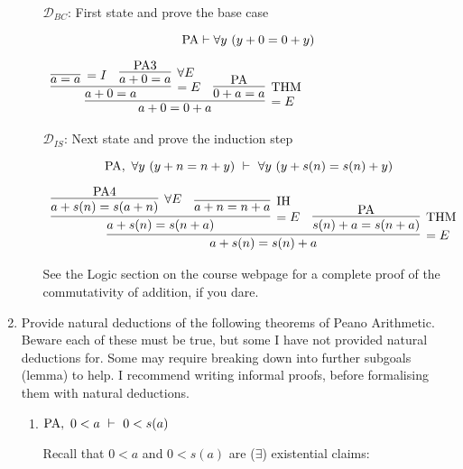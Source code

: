 \documentclass[11pt]{report}
\begin{document}
\begin{enumerate}
\begin{enumerate}
		$\mathcal{D}_{BC}$: First state and prove the base case 

		$$ \text{PA} \vdash \forall y \ (y + 0 = 0 + y)$$

		\begin{mdframed}
			\begin{center}
				$\begin{array}{c}
					\infer[=E]{a + 0 = 0 + a}
						{\infer[=E]{a + 0 = a}
							{\infer[=I]{a=a}{}
							&
							\infer[\forall E]{a + 0 = a}{\PA 3}}
						&
						\infer[\THM]{0 + a = a}{\PA}}
				\end{array}$
			\end{center}
		\end{mdframed}

		$\mathcal{D}_{IS}$: Next state and prove the induction step

		$$ \PA, \ \forall y \ (y + n  = n + y) \ \vdash \ \forall y \ (y + s(n)  = s(n) + y)$$

		\begin{mdframed}
			\begin{center}
				$\begin{array}{c}
					\infer[=E]{a + s(n) = s(n) + a}
						{\infer[=E]{a + s(n) = s(n + a)}
							{\infer[\forall E]{a + s(n) = s(a+n)}
								{\PA 4}
							&
							\infer[\IH]{a + n = n + a}
								{}}
						&
						\infer[\THM]{s(n) + a = s(n+a)}{\PA}}
				\end{array}$
			\end{center}
		\end{mdframed}
		
		See the Logic section on the course webpage for a complete proof of the commutativity of addition, if you dare.
		
		\newpage
	\end{enumerate}

	\newpage
	\item Provide natural deductions of the following theorems of Peano Arithmetic. Beware each of these must be true, but some I have not provided natural deductions for. Some may require breaking down into further subgoals (lemma) to help. I recommend writing informal proofs, before formalising them with natural deductions.
	
		\begin{enumerate}
			\item $\text{PA} , \ 0 < a \ \vdash \ 0 < s(a)$
			
			Recall that $0 < a$ and $0 < s(a)$ are ($\exists$) existential claims:
			

\end{enumerate}
\end{enumerate}
\end{document}
